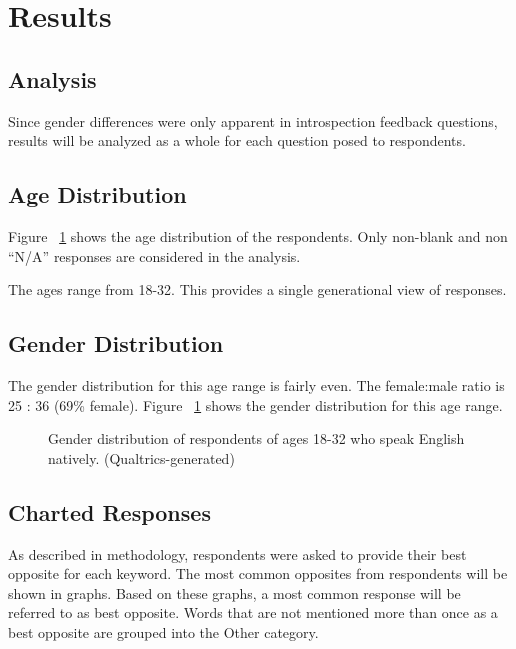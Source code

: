 \section {Results}
\subsection {Analysis} Since gender differences were only apparent in introspection feedback questions, results will be analyzed as a whole for each question posed to respondents.

\subsection {Age Distribution} Figure ~\ref{fig:gender_distribution} shows the age distribution of the respondents.  Only non-blank and non ``N/A'' responses are considered in the analysis.

The ages range from 18-32.  This provides a single generational view of responses. 

\subsection {Gender Distribution} The gender distribution for this age range is fairly even.  The female:male ratio is 25 : 36 (69\% female). Figure ~\ref{fig:gender_distribution} shows the gender distribution for this age range.

\begin{figure}[here]
	\centering
	\caption{Gender distribution of respondents of ages 18-32 who speak English natively. (Qualtrics-generated)}
	\label{fig:gender_distribution}
\end{figure}

\subsection {Charted Responses} As described in methodology, respondents were asked to provide their best opposite for each keyword.  The most common opposites from respondents will be shown in graphs.  Based on these graphs, a most common response will be referred to as best opposite.  Words that are not mentioned more than once as a best opposite are grouped into the Other category.  
 

